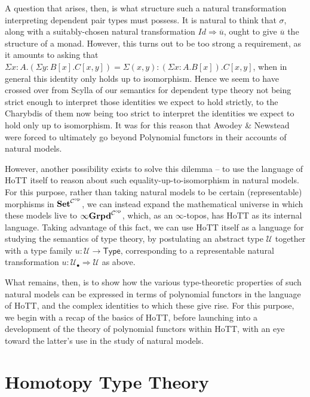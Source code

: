 \documentclass[
  11pt,
  oneside,
  article]{memoir}
\theoremstyle{definition}
\theoremstyle{plain}
\newcommand{\Cat}[1]{\mathbf{#1}}%
\newcommand{\op}{^\tn{op}}
\newcommand{\tn}[1]{\textnormal{#1}}
\newcommand{\smset}{\Cat{Set}}
\newcommand{\0}{\textsf{0}}
\newcommand{\1}{\tn{\textsf{1}}}
\begin{document}
A question that arises, then, is what structure such a natural
transformation interpreting dependent pair types must possess. It is
natural to think that \(\sigma\), along with a suitably-chosen natural
transformation \(Id \Rightarrow \overline{u}\), ought to give
\(\overline{u}\) the structure of a monad. However, this turns out to be
too strong a requirement, as it amounts to asking that
\(\Sigma x : A . (\Sigma y : B[x] . C[x,y]) = \Sigma (x,y) : (\Sigma x : A . B[x]) . C[x,y]\),
when in general this identity only holds up to isomorphism. Hence we
seem to have crossed over from Scylla of our semantics for dependent
type theory not being strict enough to interpret those identities we
expect to hold strictly, to the Charybdis of them now being too strict
to interpret the identities we expect to hold only up to isomorphism. It
was for this reason that Awodey \& Newstead were forced to ultimately go
beyond Polynomial functors in their accounts of natural models.

However, another possibility exists to solve this dilemma -- to use the
language of HoTT itself to reason about such equality-up-to-isomorphism
in natural models. For this purpose, rather than taking natural models
to be certain (representable) morphisms in
\(\smset^{\mathcal{C}\op}\), we can instead expand the
mathematical universe in which these models live to
\(\mathbf{\infty Grpd}^{\mathcal{C}\op}\), which, as an
\(\infty\)-topos, has HoTT as its internal language. Taking advantage of
this fact, we can use HoTT itself as a language for studying the
semantics of type theory, by postulating an abstract type
\(\mathcal{U}\) together with a type family
\(u : \mathcal{U} \to \mathsf{Type}\), corresponding to a representable
natural transformation
\(u : \mathcal{U}_\bullet \Rightarrow \mathcal{U}\) as above.

What remains, then, is to show how the various type-theoretic properties
of such natural models can be expressed in terms of polynomial functors
in the language of HoTT, and the complex identities to which these give
rise. For this purpose, we begin with a recap of the basics of HoTT,
before launching into a development of the theory of polynomial functors
within HoTT, with an eye toward the latter's use in the study of natural
models.

\section{Homotopy Type Theory}\label{homotopy-type-theory}
\end{document}

